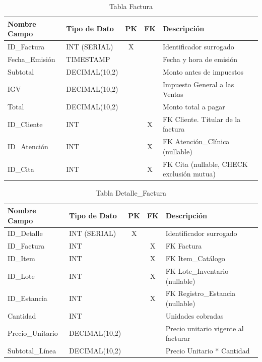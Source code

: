 \begin{table}[H]
\centering
\footnotesize
\begin{tabular}{|l|l|c|c|p{5cm}|}
\hline
\textbf{Nombre Campo} & \textbf{Tipo de Dato} & \textbf{PK} & \textbf{FK} & \textbf{Descripción} \\
\hline
ID\_Factura & INT (SERIAL) & X & & Identificador surrogado \\
\hline
Fecha\_Emisión & TIMESTAMP & & & Fecha y hora de emisión \\
\hline
Subtotal & DECIMAL(10,2) & & & Monto antes de impuestos \\
\hline
IGV & DECIMAL(10,2) & & & Impuesto General a las Ventas \\
\hline
Total & DECIMAL(10,2) & & & Monto total a pagar \\
\hline
ID\_Cliente & INT & & X & FK Cliente. Titular de la factura \\
\hline
ID\_Atención & INT & & X & FK Atención\_Clínica (nullable) \\
\hline
ID\_Cita & INT & & X & FK Cita (nullable, CHECK exclusión mutua) \\
\hline
\end{tabular}
\caption{Tabla Factura}
\end{table}

\begin{table}[H]
\centering
\footnotesize
\begin{tabular}{|l|l|c|c|p{5cm}|}
\hline
\textbf{Nombre Campo} & \textbf{Tipo de Dato} & \textbf{PK} & \textbf{FK} & \textbf{Descripción} \\
\hline
ID\_Detalle & INT (SERIAL) & X & & Identificador surrogado \\
\hline
ID\_Factura & INT & & X & FK Factura \\
\hline
ID\_Item & INT & & X & FK Item\_Catálogo \\
\hline
ID\_Lote & INT & & X & FK Lote\_Inventario (nullable) \\
\hline
ID\_Estancia & INT & & X & FK Registro\_Estancia (nullable) \\
\hline
Cantidad & INT & & & Unidades cobradas \\
\hline
Precio\_Unitario & DECIMAL(10,2) & & & Precio unitario vigente al facturar \\
\hline
Subtotal\_Línea & DECIMAL(10,2) & & & Precio Unitario * Cantidad \\
\hline
\end{tabular}
\caption{Tabla Detalle\_Factura}
\end{table}

